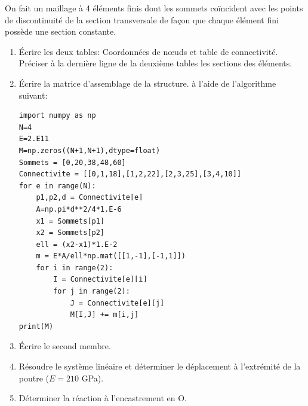 \documentclass{article}
\begin{document}
On fait un maillage à 4 éléments finis dont les sommets coïncident avec les points de discontinuité de la section transversale de façon que chaque élément fini possède une section constante. 
\begin{enumerate}
\item Écrire les deux tables: Coordonnées de nœuds et table de connectivité. Préciser à la dernière ligne de la deuxième tables les sections des éléments.
\item Écrire la matrice d'assemblage de la structure. à l'aide de l'algorithme suivant:
\begin{verbatim}
import numpy as np
N=4
E=2.E11
M=np.zeros((N+1,N+1),dtype=float)
Sommets = [0,20,38,48,60]
Connectivite = [[0,1,18],[1,2,22],[2,3,25],[3,4,10]]
for e in range(N):
    p1,p2,d = Connectivite[e]
    A=np.pi*d**2/4*1.E-6
    x1 = Sommets[p1]
    x2 = Sommets[p2]
    ell = (x2-x1)*1.E-2
    m = E*A/ell*np.mat([[1,-1],[-1,1]])
    for i in range(2):
        I = Connectivite[e][i]
        for j in range(2):
            J = Connectivite[e][j]
            M[I,J] += m[i,j]
print(M)
\end{verbatim}
\item Écrire le second membre.
\item Résoudre le système linéaire et déterminer le déplacement à l'extrémité de la poutre ($E=210$ GPa).
\item  Déterminer la réaction à l'encastrement en O.
\end{enumerate}
\end{document}
